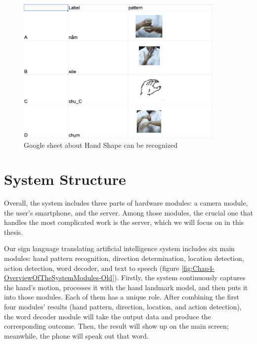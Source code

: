 \begin{figure}[H]
	\centering
	\includegraphics[width=0.9\textwidth]{img/Chap4/Sheet-Pattern.png}
	\caption{Google sheet about Hand Shape can be recognized}
	\label{fig:Chap4-Sheet-Pattern}
\end{figure}



\section{System Structure}

Overall, the system includes three parts of hardware modules: a camera module, the user's smartphone, and the server. Among those modules, the crucial one that handles the most complicated work is the server, which we will focus on in this thesis.

Our sign language translating artificial intelligence system includes six main modules: hand pattern recognition, direction determination, location detection, action detection, word decoder, and text to speech (figure \ref{fig:Chap4-OverviewOfTheSystemModules-Old}). Firstly, the system continuously captures the hand's motion, processes it with the hand landmark model, and then puts it into those modules. Each of them has a unique role. After combining the first four modules' results (hand pattern, direction, location, and action detection), the word decoder module will take the output data and produce the corresponding outcome. Then, the result will show up on the main screen; meanwhile, the phone will speak out that word.

